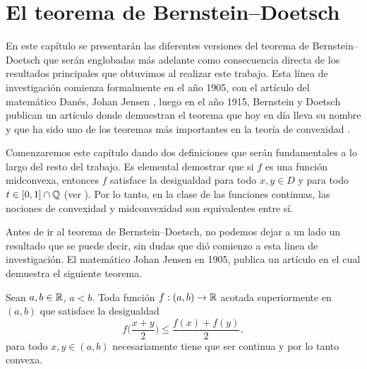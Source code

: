 \chapter{El teorema de Bernstein--Doetsch}
\label{chapPrevio}

En este capítulo se presentarán las diferentes versiones 
del teorema de Bernstein--Doetsch que serán englobadas más 
adelante como consecuencia directa de los resultados principales que
obtuvimos al realizar este trabajo. Esta línea de investigación
comienza formalmente en el año 1905, con el artículo del matemático 
Danés, Johan Jensen \cite{Jen06}, luego en el año 1915, Bernstein y Doetsch 
publican un artículo donde demuestran el teorema que hoy en día lleva su nombre 
y que ha sido uno de los teoremas más importantes en la teoría de convexidad \cite{Kuc09}. 

Comenzaremos este capítulo dando dos definiciones que serán fundamentales
a lo largo del resto del trabajo.
Es elemental demostrar que si $f$ es una función midconvexa,
entonces $f$ satisface la desigualdad  para todo
$x,y\in D$ y para todo $t\in[0,1]\cap\mathbb{Q}$ (ver \cite{Kuc09}). 
Por lo tanto, en la clase de las funciones continuas, las nociones
de convexidad y midconvexidad son equivalentes entre sí.

Antes de ir al teorema de Bernstein--Doetsch, no podemos dejar a un lado un resultado 
que se puede decir, sin dudas que dió comienzo a esta linea de investigación. 
El matemático Johan Jensen en 1905, 
publica un artículo en el cual demuestra el siguiente teorema. 

\begin{theorem}
\label{TJensenFirst}
Sean $a,b\in\mathbb{R}$, $a<b$. 
Toda función $f:(a,b)\to\mathbb{R}$ acotada superiormente en $(a,b)$ que satisface 
la desigualdad
$$
f\bigg(\frac{x+y}{2}\bigg)\leq \frac{f(x)+f(y)}{2},
$$
para todo $x,y\in (a,b)$ necesariamente tiene que ser continua
y por lo tanto convexa.
\end{theorem}

